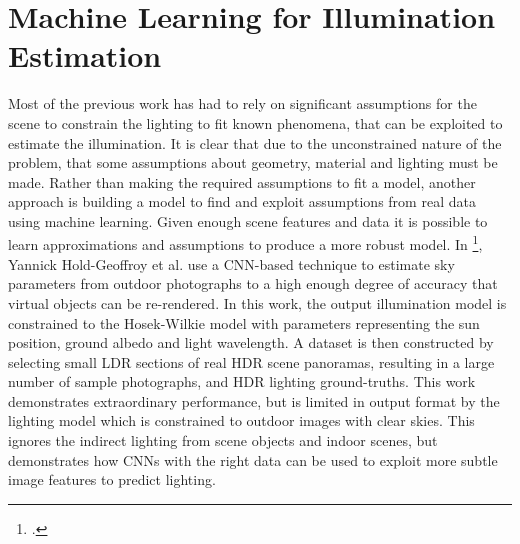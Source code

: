 \documentclass[ %
                    author={Gavin Parker},
                supervisor={Dr. Neill Campbell},
                    degree={MEng},
                     title={Deep Siamese Networks for Illumination Estimation from Stereo Images},
                  subtitle={},
                      type={research},
                      year={2018} ]{dissertation}
\begin{document}
\section{Machine Learning for Illumination Estimation}
Most of the previous work has had to rely on significant assumptions for the scene to constrain the lighting to fit known phenomena, that can be exploited to estimate the illumination. It is clear that due to the unconstrained nature of the problem, that some assumptions about geometry, material and lighting must be made. Rather than making the required assumptions to fit a model, another approach is building a model to find and exploit assumptions from real data using machine learning. Given enough scene features and data it is possible to learn approximations and assumptions to produce a more robust model. In \footcite{https://arxiv.org/pdf/1611.06403.pdf}, Yannick Hold-Geoffroy et al. use a CNN-based technique to estimate sky parameters from outdoor photographs to a high enough degree of accuracy that virtual objects can be re-rendered. In this work, the output illumination model is constrained to the Hosek-Wilkie model with parameters representing the sun position, ground albedo and light wavelength. A dataset is then constructed by selecting small LDR sections of real HDR scene panoramas, resulting in a large number of sample photographs, and HDR lighting ground-truths. This work demonstrates extraordinary performance, but is limited in output format by the lighting model which is constrained to outdoor images with clear skies. This ignores the indirect lighting from scene objects and indoor scenes, but demonstrates how CNNs with the right data can be used to exploit more subtle image features to predict lighting.
\newline
\end{document}
